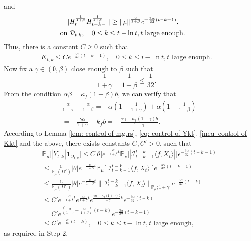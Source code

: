 \documentclass[12pt]{amsart}
\theoremstyle{plain}
\theoremstyle{definition}
\numberwithin{equation}{section}
\begin{document}
    and
\begin{align*}
    |H_t^{\frac{1}{1+\beta}}H_{t-k-1}^{\frac{1}{1+\beta}}|
    \geq \|\mu\|^{\frac{2}{1+\beta}} e^{-\frac{3\alpha}{32}(t-k-1)},
    \\ && \mathllap{ \text{ on } \mathcal D_{t,k}, \quad 0 \leq k \leq t - \ln t, t \text{ large enouph.} }
\end{align*}
    Thus, there is a constant $C\geq 0$ such that 
\begin{align}
\label{ineq: control of Kkt}
     K_{t,k}
     \leq C e^{-\frac{3\alpha}{32}(t-k-1)},
    \quad 0 \leq k \leq t - \ln t, t \text{ large enouph.} 
\end{align}
    Now fix a $\gamma \in (0, \beta)$ close enough to $\beta$ such that 
\[
    \frac{1}{1+\gamma} - \frac{1}{1+\beta} 
    \leq \frac{1}{32}.
\]
    From the condition $\alpha\beta=\kappa_f(1+\beta)b$, we can verify that 
\begin{align}
    &\frac{\alpha}{1+\gamma}-\frac{\alpha}{1+\beta}
    = -\alpha(1-\frac{1}{1+\gamma}) + \alpha(1-\frac{1}{1+\beta})
    \\&= -\frac{\gamma \alpha}{1+\gamma} + k_f b
    =-\frac{\alpha \gamma-\kappa_f(1+\gamma)b}{1+\gamma}.
\end{align}
    According to Lemma \ref{lem: control of mgtrs}, \eqref{eq: control of Ykt}, \eqref{ineq: control of Kkt} and the above, there exists constants $C,C'>0$, such that
\begin{align}
\label{eq: Y in D}
    &\mathbb{\tilde{P}}_{\mu}\big[|Y_{t,k}|\mathbf{1}_{\mathcal{D}_{t,k}}\big]
    \leq C|\theta|e^{-\frac{\alpha}{1+\beta}t}\mathbb{\tilde{P}}_{\mu}\big[|\mathcal{I}_{t-k-1}^{t-k}\langle f,X_t\rangle|\big]e^{-\frac{3\alpha}{32}(t-k-1)}
    \\&\leq \frac{C}{\mathbb{P}_{\mu}(D^c)}|\theta|e^{-\frac{\alpha}{1+\beta}t}\mathbb{P}_{\mu}\big[|\mathcal{I}_{t-k-1}^{t-k}\langle f,X_t\rangle|\big]e^{-\frac{3\alpha}{32}(t-k-1)}
    \\&\leq \frac{C}{\mathbb{P}_{\mu}(D^c)}|\theta|e^{-\frac{\alpha}{1+\beta}t}\|\mathcal{I}_{t-k-1}^{t-k}\langle f,X_t\rangle\|_{\mathbb P_\mu; 1+\gamma} e^{-\frac{3\alpha}{32}(t-k)}
    \\&\leq C' e^{-\frac{\alpha}{1+\beta}t}e^{\frac{\alpha}{1+\gamma}t}e^{\frac{\gamma \alpha-\kappa_f(1+\gamma)b}{1+\gamma}k}e^{-\frac{3\alpha}{32}(t-k)}\\&= C' e^{(\frac{\alpha}{1+\gamma}-\frac{\alpha}{1+\beta})(t-k)}e^{-\frac{3\alpha}{32}(t-k-1)}
    \\&\leq C' e^{-\frac{\alpha}{16}(t-k)},
    \quad 0\leq k\leq t-\ln t, t\text{ large enough,}
\end{align}
    as required in Step 2.
\end{document}
